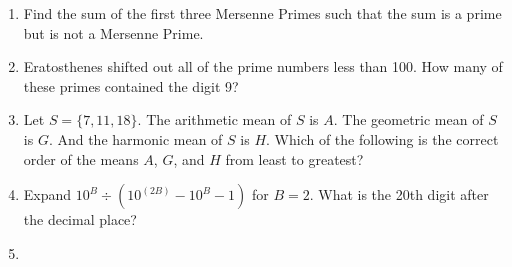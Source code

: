 \documentclass[../uilmath.tex]{subfiles}
\begin{document}
\begin{enumerate}[label=\bfseries\arabic*.]
    \item %
    Find the sum of the first three Mersenne Primes such that the sum is a prime but is not a Mersenne Prime.

    \item %
    Eratosthenes shifted out all of the prime numbers less than 100. How many of these primes contained the digit 9?

    \item %
    Let $S=\{7,11,18\}$. The arithmetic mean of $S$ is $A$. The geometric mean of $S$ is $G$. And the harmonic mean of $S$ is $H$.
    Which of the following is the correct order of the means $A$, $G$, and $H$ from least to greatest?

    \item %
    Expand $10^B \div (10^{(2B)}-10^B-1)$ for $B=2$. What is the 20th digit after the decimal place?

    \item %
    

\end{enumerate}
\end{document}
